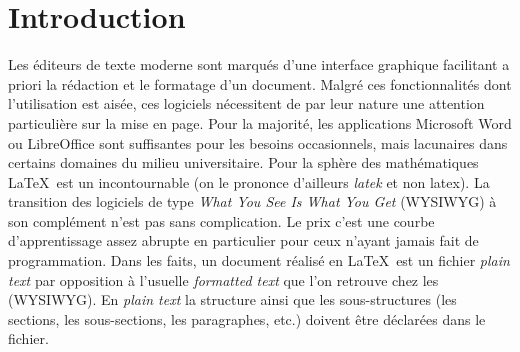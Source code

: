 \twocolumn
	\section*{Introduction}
	Les éditeurs de texte \og moderne\fg{} sont marqués d'une interface graphique facilitant a priori la rédaction et le formatage d'un document. Malgré ces fonctionnalités dont l'utilisation est aisée, ces logiciels nécessitent de par leur nature une attention particulière sur la mise en page. Pour la majorité, les applications Microsoft Word ou LibreOffice sont suffisantes pour les besoins occasionnels, mais lacunaires dans certains domaines du milieu universitaire. Pour la sphère des mathématiques \LaTeX~est un incontournable (on le prononce d'ailleurs \og \textit{latek}\fg{} et non latex). La transition des logiciels de type \emph{What You See Is What You Get} (WYSIWYG) à son complément n'est pas sans complication. Le prix c'est une courbe d'apprentissage assez abrupte en particulier pour ceux n'ayant jamais fait de programmation. Dans les faits, un document réalisé en \LaTeX~est un fichier \emph{plain text} par opposition à l'usuelle \emph{formatted text} que l'on retrouve chez les (WYSIWYG). En \emph{plain text} la structure ainsi que les sous-structures (les sections, les sous-sections, les paragraphes, etc.) doivent être déclarées dans le fichier.	
